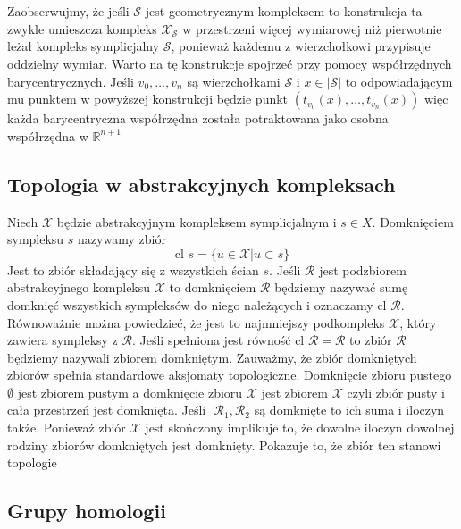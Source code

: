 \documentclass[12pt,a4paper]{article}
\newcommand{\symcom}[1]{\mathcal{#1}}
\begin{document}
\\
 \\
 \noindent
 Zaobserwujmy, że jeśli $\symcom{S}$ jest geometrycznym kompleksem to konstrukcja ta zwykle umieszcza kompleks $\symcom{X}_{\symcom{S}}$ w przestrzeni więcej wymiarowej niż pierwotnie leżał kompleks symplicjalny $\symcom {S}$, ponieważ każdemu z wierzchołkowi przypisuje oddzielny wymiar. Warto na tę konstrukcje spojrzeć przy pomocy współrzędnych barycentrycznych. Jeśli $v_0,\ldots,v_n$  są wierzchołkami $\symcom{S}$ i $x\in|\symcom{S}|$ to odpowiadającym mu punktem w powyższej konstrukcji będzie punkt $(t_{v_0}(x),\ldots,t_{v_n}(x))$  więc każda barycentryczna współrzędna została potraktowana jako osobna współrzędna w $\mathbb{R}^{n+1}$
\subsection{Topologia w abstrakcyjnych kompleksach}

Niech $\mathcal{X}$ będzie abstrakcyjnym kompleksem symplicjalnym i $s\in X$. Domknięciem sympleksu $s$ nazywamy zbiór 
$$\text{cl }s=\{u\in \mathcal{X}|u\subset s \}$$
 Jest to zbiór składający się z wszystkich ścian $s$. Jeśli $\mathcal{R}$ jest podzbiorem abstrakcyjnego kompleksu $\mathcal{X}$ to domknięciem $\mathcal{R}$ będziemy nazywać sumę domknięć wszystkich sympleksów do niego należących i oznaczamy $\text{cl }\mathcal{R}$. Równoważnie można powiedzieć, że jest to najmniejszy podkompleks $\mathcal{X}$, który zawiera sympleksy z $\mathcal{R}$.  Jeśli spełniona jest równość $\text{cl }\mathcal{R} =\mathcal{R}$ to zbiór $\mathcal{R}$ będziemy nazywali zbiorem domkniętym. Zauważmy, że zbiór domkniętych zbiorów spełnia standardowe aksjomaty topologiczne. Domknięcie zbioru pustego $\emptyset$ jest zbiorem pustym a domknięcie zbioru $\mathcal{X}$ jest zbiorem $\mathcal{X}$ czyli zbiór pusty i cała przestrzeń jest domknięta. Jeśli $\mathcal{}$ $\mathcal{R}_1,\mathcal{R_2}$ są domknięte to ich suma i iloczyn także. Ponieważ zbiór $\mathcal{X}$ jest skończony implikuje to, że dowolne iloczyn dowolnej rodziny zbiorów domkniętych jest domknięty. Pokazuje to, że zbiór ten stanowi topologie
\\[Przykład kompleksu ze skończoną topologią]
\subsection{Grupy homologii}
\end{document}
